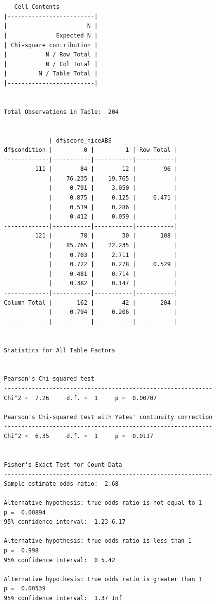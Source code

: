 \documentclass[
  letterpaper,
  DIV=11,
  numbers=noendperiod]{scrreprt}
\begin{document}
\begin{verbatim}

 
   Cell Contents
|-------------------------|
|                       N |
|              Expected N |
| Chi-square contribution |
|           N / Row Total |
|           N / Col Total |
|         N / Table Total |
|-------------------------|

 
Total Observations in Table:  204 

 
             | df$score_niceABS 
df$condition |         0 |         1 | Row Total | 
-------------|-----------|-----------|-----------|
         111 |        84 |        12 |        96 | 
             |    76.235 |    19.765 |           | 
             |     0.791 |     3.050 |           | 
             |     0.875 |     0.125 |     0.471 | 
             |     0.519 |     0.286 |           | 
             |     0.412 |     0.059 |           | 
-------------|-----------|-----------|-----------|
         121 |        78 |        30 |       108 | 
             |    85.765 |    22.235 |           | 
             |     0.703 |     2.711 |           | 
             |     0.722 |     0.278 |     0.529 | 
             |     0.481 |     0.714 |           | 
             |     0.382 |     0.147 |           | 
-------------|-----------|-----------|-----------|
Column Total |       162 |        42 |       204 | 
             |     0.794 |     0.206 |           | 
-------------|-----------|-----------|-----------|

 
Statistics for All Table Factors


Pearson's Chi-squared test 
------------------------------------------------------------
Chi^2 =  7.26     d.f. =  1     p =  0.00707 

Pearson's Chi-squared test with Yates' continuity correction 
------------------------------------------------------------
Chi^2 =  6.35     d.f. =  1     p =  0.0117 

 
Fisher's Exact Test for Count Data
------------------------------------------------------------
Sample estimate odds ratio:  2.68 

Alternative hypothesis: true odds ratio is not equal to 1
p =  0.00894 
95% confidence interval:  1.23 6.17 

Alternative hypothesis: true odds ratio is less than 1
p =  0.998 
95% confidence interval:  0 5.42 

Alternative hypothesis: true odds ratio is greater than 1
p =  0.00539 
95% confidence interval:  1.37 Inf 


 
\end{verbatim}
\end{document}

